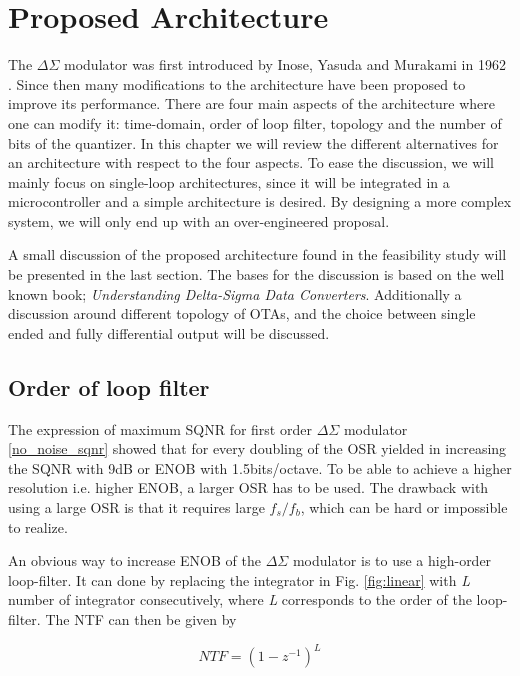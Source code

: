\chapter{Proposed Architecture}\label{architecture}

The $\Delta\Sigma$ modulator was first introduced by Inose, Yasuda and Murakami in 1962 \cite{first_delta}. Since then many modifications to the architecture have been proposed to improve its performance. There are four main aspects of the architecture where one can modify it: time-domain, order of loop filter, topology and the number of bits of the quantizer. In this chapter we will review the different alternatives for an architecture with respect to the four aspects. To ease the discussion, we will mainly focus on single-loop architectures, since it will be integrated in a microcontroller and a simple architecture is desired. By designing a more complex system, we will only end up with an over-engineered proposal. 

A small discussion of the proposed architecture found in the feasibility study will be presented in the last section. The bases for the discussion is based on the well known book; \textit{Understanding Delta-Sigma Data Converters}\cite{Richard}. Additionally a discussion around different topology of OTAs, and the choice between single ended and fully differential output will be discussed.  

\section{Order of loop filter}

The expression of maximum SQNR for first order $\Delta\Sigma$ modulator \ref{no_noise_sqnr} showed that for every doubling of the OSR yielded in increasing the SQNR with 9dB or ENOB with 1.5bits/octave. To be able to achieve a higher resolution i.e. higher ENOB, a larger OSR has to be used. The drawback with using a large OSR is that it requires large $f_s/f_b$, which can be hard or impossible to realize. 

An obvious way to increase ENOB of the $\Delta\Sigma$ modulator is to use a high-order loop-filter. It can done by replacing the integrator in Fig. \ref{fig:linear} with \textit{L} number of integrator consecutively, where \textit{L} corresponds to the order of the loop-filter. The NTF can then be given by

\begin{equation}
    NTF = (1-z^{-1})^L
\end{equation}

